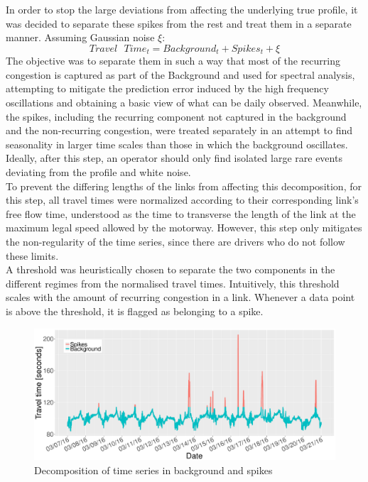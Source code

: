 \documentclass[conference]{IEEEtran}
\begin{document}
In order to stop the large deviations from affecting the underlying true profile, it was decided to separate these spikes from the rest and treat them in a separate manner. 
Assuming Gaussian noise $\xi$:
\begin{equation}
Travel \textrm{ } Time_t = Background_t + Spikes_t + \xi
\end{equation}
The objective was to separate them in such a way that most of the recurring congestion is captured as part of the Background and used for spectral analysis, attempting to mitigate the prediction error induced by the high frequency oscillations and obtaining a basic view of what can be daily observed.
Meanwhile, the spikes, including the recurring component not captured in the background and the non-recurring congestion, were treated separately in an attempt to find seasonality in larger time scales than those in which the background oscillates. 
Ideally, after this step, an operator should only find isolated large rare events deviating from the profile and white noise.\\

To prevent the differing lengths of the links from affecting this decomposition, for this step, all travel times were normalized according to their corresponding link's free flow time, understood as the time to transverse the length of the link at the maximum legal speed allowed by the motorway. 
However, this step only mitigates the non-regularity of the time series, since there are drivers who do not follow these limits.\\

A threshold was heuristically chosen to separate the two components in the different regimes from the normalised travel times. 
Intuitively, this threshold scales with the amount of recurring congestion in a link. 
Whenever a data point is above the threshold, it is flagged as belonging to a spike.

\begin{figure}[htbp]
	\centering
	\includegraphics[width=\linewidth]{BS.pdf}
	\caption{ Decomposition of time series in background and spikes }
	\label{fig:Background}
\end{figure}
\end{document}
